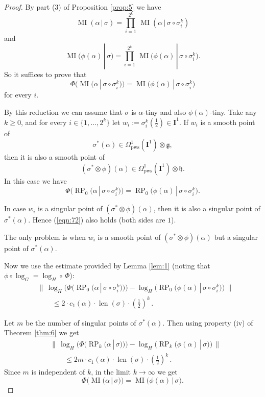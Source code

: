 \documentclass[10pt, a4paper]{amsart}
\theoremstyle{definition}
\numberwithin{equation}{section}
\newcommand{\opn}{\operatorname}
\newcommand{\mfrak}[1]{\mathfrak{#1}}
\newcommand{\mbf}[1]{\mathbf{#1}}
\newcommand{\mrm}[1]{\mathrm{#1}}
\newcommand{\smfrac}[2]{{\textstyle \frac{#1}{#2}}}
\newcommand{\Norm}[1]{\bigl\lVert\, #1 \, \bigr\rVert}
\renewcommand{\vert}{\, | \,}
\newcommand{\g}{\mfrak{g}}
\newcommand{\h}{\mfrak{h}}
\begin{document}
\begin{proof}
By part (3) of Proposition \ref{prop:5} we have
\[ \opn{MI}(\alpha \vert \sigma )  =
\prod_{i = 1}^{2^k}  \, 
\opn{MI}(\alpha \vert \sigma \circ \sigma^k_i )  \]
and
\[ \opn{MI} \bigl( \phi(\alpha) \vert \sigma \bigr) =
\prod_{i = 1}^{2^k}  \, 
\opn{MI} \bigl( \phi(\alpha) \vert \sigma \circ \sigma^k_i \bigr) . \]
So it suffices to prove that 
\[ \Phi \bigl( \opn{MI}(\alpha \vert \sigma \circ \sigma^k_i) \bigr) = 
\opn{MI} \bigl( \phi(\alpha) \vert \sigma \circ \sigma^k_i \bigr) \]
for every $i$. 

By this reduction we can assume that 
$\sigma$ is $\alpha$-tiny and also $\phi(\alpha)$-tiny.
Take any $k \geq 0$, and for every $i \in \{ 1, \ldots, 2^k \}$ let 
$w_i := \sigma^k_i(\smfrac{1}{2}) \in \mbf{I}^{1}$. 
If $w_i$ is a smooth point of 
\[ \sigma^*(\alpha) \in \Omega^1_{\mrm{pws}}(\mbf{I}^{1}) \otimes 
\g , \]
then it is also a smooth point of 
\[ (\sigma^* \otimes \phi)(\alpha)  
\in \Omega^1_{\mrm{pws}}(\mbf{I}^{1}) \otimes \h .  \]
In this case we have
\begin{equation} \label{eqn:72}
\Phi \bigl( \opn{RP}_{0}(\alpha \vert \sigma \circ \sigma^k_i) 
\bigr) =
\opn{RP}_0 \bigl( \phi(\alpha) \vert \sigma \circ \sigma^k_i \bigr) .
\end{equation}

In case $w_i$ is a singular point of
$(\sigma^* \otimes \phi)(\alpha)$,
then it is also a singular point of 
$\sigma^*(\alpha)$.
Hence (\ref{eqn:72}) also holds (both sides are $1$). 

The only problem is when $w_i$ is a smooth point of
$(\sigma^* \otimes \phi)(\alpha)$
but a singular point of $\sigma^*(\alpha)$.

Now we use the estimate provided by Lemma \ref{lem:1}
(noting that $\phi \circ \log_G = \log_H \circ\, \Phi$):
\[ \begin{aligned}
& \Norm{ \log_H \bigl( \Phi \bigl( \opn{RP}_{0} 
(\alpha \vert \sigma \circ \sigma^k_i ) \bigl) \bigr) - 
\log_H \bigl( \opn{RP}_{0} \bigl( \phi(\alpha) \vert 
\sigma \circ \sigma^k_i \bigr) \bigr) } \\
& \qquad 
\leq 2 \cdot c_1(\alpha) \cdot \opn{len}(\sigma) \cdot (\smfrac{1}{2})^k \, .
\end{aligned} \]

Let $m$ be the number of singular points of $\sigma^*(\alpha)$. 
Then using property (iv) of Theorem \ref{thm:6} we get
\[ \begin{aligned}
& \Norm{ \log_H \bigl( \Phi \bigl( \opn{RP}_{k} 
(\alpha \vert \sigma) \bigl) \bigr) - 
\log_H \bigl( \opn{RP}_{k} \bigl( \phi(\alpha) \vert 
\sigma \bigr) \bigr) } \\
& \qquad 
\leq 2 m \cdot c_1(\alpha) \cdot \opn{len}(\sigma) \cdot (\smfrac{1}{2})^k \, .
\end{aligned} \]
Since $m$ is independent of $k$, in the limit $k \to \infty$ we get
\[ \Phi \bigl( \opn{MI} (\alpha \vert \sigma) \bigl) = 
\opn{MI} \bigl( \phi(\alpha) \vert \sigma \bigr) . \]
\end{proof}
\end{document}
